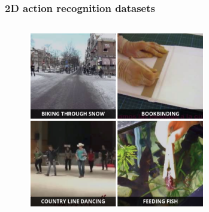 \documentclass[9pt]{beamer}
\newenvironment{myframe}[1][]{%
\begin{frame}%
\frametitle{#1}
\setcounter{footnote}{0}


}{%
\end{frame}%
}
\begin{document}
\begin{myframe}[2D action recognition datasets]
\begin{columns}[T]
\begin{column}{.48\textwidth}
\begin{figure}
          \end{figure}
          \begin{figure}
              \includegraphics[width=0.69\textwidth]{kinetics-example.png}
          \end{figure}
      \end{column}
  \end{columns}
\end{myframe}
\end{document}

